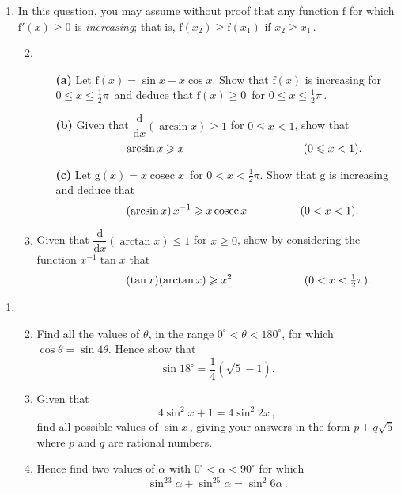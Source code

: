 \documentclass[a4, 11pt]{report}
\newlength{\qspace}
\newcounter{qnumber}
\newenvironment{question}%
 {\vspace{\qspace}
  \begin{enumerate}[\bfseries 1\quad][10]%
    \setcounter{enumi}{\value{qnumber}}%
    \item%
 }
{
  \end{enumerate}
  \filbreak
  \stepcounter{qnumber}
 }
\newenvironment{questionparts}[1][1]%
 {
  \begin{enumerate}[\bfseries (i)]%
    \setcounter{enumii}{#1}
    \addtocounter{enumii}{-1}
    \setlength{\itemsep}{5mm}
    \setlength{\parskip}{8pt}
 }
 {
  \end{enumerate}
 }
\DeclareMathOperator{\cosec}{cosec}
\def\d{{\mathrm d}}
\def\g{{\mathrm g}}
\def\f{{\mathrm f}}
\def\le{\leqslant}
\def\ge{\geqslant}
\begin{document}
\begin{question}
In this question, you may assume without proof that 
 any function $\f$ for which  $\f'(x)\ge 0$ is {\em 
 increasing}; that is,
$\f(x_2)\ge \f(x_1)$ if $x_2\ge x_1\,$. 

\begin{questionparts}
\item 
\begin{itemize}
\item[{\bf (a)}]
 Let $\f(x) =\sin x -x\cos x$.
 Show that $\f(x)$ is 
increasing 
for $0\le x \le \frac12\pi\,$
and deduce that $\f(x)\ge 0\,$ for 
$0\le x \le \frac12\pi\,$.
\\
\item[{\bf (b)}] 
Given that $\dfrac{\d}{\d x} (\arcsin x)  \ge1$ for 
$0\le x< 1$,
show that 
\[
\hspace {1.1cm}
\arcsin x\ge  x
\hspace*{3.8cm}(0\le x <   1).
\]
\item[{\bf (c)}] Let $\g(x)= x\cosec x\,$ for $0<x<\frac12\pi$. Show that
$\g$ is increasing and deduce that
\[
\hspace{1cm}
({\arcsin x})\,  x^{-1} \ge    x\,{\cosec x}
\hspace{1.7cm} (0<x<1). 
\]
\end{itemize}
 \item
Given that $\dfrac{\d}{\d x}
 (\arctan x)\le 1$ for $x\ge 0$, show
by considering the function $x^{-1} \tan x$ 
that 
\[
\hspace{2cm}(\tan x)( \arctan x) \ge x^2
\hspace{2.3cm}
(0<x<\tfrac12\pi).
\]
\end{questionparts}
\end{question}

\begin{question}
\begin{questionparts}
\item
 Find all the values of $\theta$, in the range $0^\circ <\theta<180^\circ$,
for which $\cos\theta=\sin 4\theta$. Hence show that
\[
\sin 18^\circ = \frac14\left( \sqrt 5 -1\right).
\]

\item Given that 
\[
4\sin^2 x + 1 = 4\sin^2 2x
\,,
\]
find
  all possible values of $\sin x\,$, giving your answers in the 
form $p+q\sqrt5$ where $p$ and $q$ are rational numbers.

\item
Hence find two values of  $\alpha$ with $0^\circ <\alpha<90^\circ$
for which
\[
\sin^23\alpha + \sin^25\alpha = \sin^2 6\alpha\,.
\]
\end{questionparts}
	\end{question}
	
\end{document}
